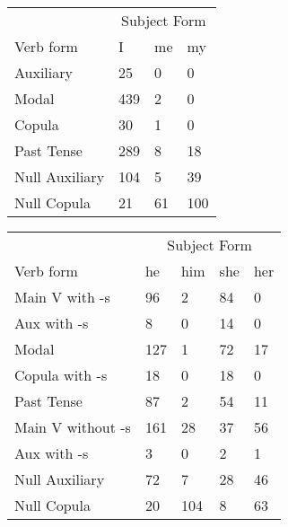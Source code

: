 \begin{table}[]
    \begin{minipage}{0.5\textwidth}
    \centering
    \begin{tabular}{@{}llll@{}}
        \toprule
            &\multicolumn{3}{c}{Subject Form}\\
            \cline{2-4}
        Verb form & I & me & my \\
        \midrule
        Auxiliary & 25 & 0 & 0 \\
        Modal & 439 & 2 & 0 \\
        Copula & 30 & 1 & 0 \\
        Past Tense & 289 & 8 & 18 \\
        \hline
        Null Auxiliary & 104 & 5 & 39 \\
        Null Copula & 21 & 61 & 100 \\
        \bottomrule
    \end{tabular}
\end{minipage}
\begin{minipage}{0.5\textwidth}
    \centering
    \begin{tabular}{@{}lllll@{}}
        \toprule
            &\multicolumn{4}{c}{Subject Form}\\
            \cline{2-5}
        Verb form & he & him & she & her \\
        \midrule
        Main V with -s & 96 & 2 & 84 & 0 \\
        Aux with -s & 8 & 0 & 14 & 0 \\
        Modal & 127 & 1 & 72 & 17 \\
        Copula with -s & 18 & 0 & 18 & 0 \\
        Past Tense & 87 & 2 & 54 & 11 \\
        \hline
        Main V without -s & 161 & 28 & 37 & 56 \\
        Aux with -s & 3 & 0 & 2 & 1 \\
        Null Auxiliary & 72 & 7 & 28 & 46 \\
        Null Copula & 20 & 104 & 8 & 63 \\
        \bottomrule
    \end{tabular}
\end{minipage}
\end{table}
